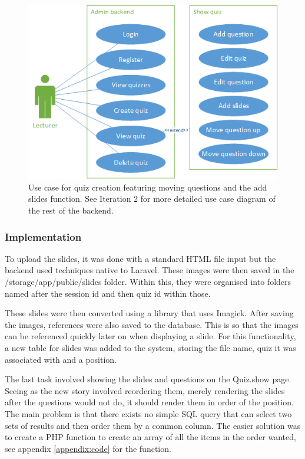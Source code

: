 \begin{figure}
	\caption{Use case for quiz creation featuring moving questions and the add slides function. See Iteration 2 for more detailed use case diagram of the rest of the backend.}
	\centerline{\includegraphics{Chapter2/Iter-7/iter-7-use-case}}
	\label{fig:iter-7-use-case}
\end{figure}

\subsubsection{Implementation}
To upload the slides, it was done with a standard HTML file input but the backend used techniques native to Laravel\cite{laravel-saving-files}. These images were then saved in the /storage/app/public/slides folder. Within this, they were organised into folders named after the session id and then quiz id within those.

These slides were then converted using a library that uses Imagick\cite{spatie-pdf-converter}. After saving the images, references were also saved to the database. This is so that the images can be referenced quickly later on when displaying a slide. For this functionality, a new table for slides was added to the system, storing the file name, quiz it was associated with and a position. 

The last task involved showing the slides and questions on the Quiz.show page. Seeing as the new story involved reordering them, merely rendering the slides after the questions would not do, it should render them in order of the position. The main problem is that there exists no simple SQL query that can select two sets of results and then order them by a common column. The easier solution was to create a PHP function to create an array of all the items in the order wanted, see appendix \ref{appendix:code} for the function.
